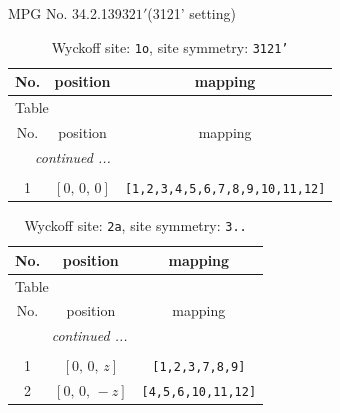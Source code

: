 \documentclass[fleqn,8pt]{jsarticle}
\begin{document}
\setcounter{MaxMatrixCols}{32}

\renewcommand{\tablename}{Table~}
\renewcommand{\figurename}{Figure~}
\begin{center}
\LARGE
MPG No. 34.2.139\quad$321'$\quad(3121' setting)
\end{center}
\renewcommand{\arraystretch}{1.2}
\begin{longtable}{ccc}
\caption{Wyckoff site: {\tt 1o}, site symmetry: {\tt 3121'}}
 \\
 \hline \hline
No. & position & mapping \\ \hline \endfirsthead

\multicolumn{2}{l}{\tablename\ \thetable{}} \\
 \hline \hline
No. & position & mapping \\ \hline \endhead

 \hline \hline
\multicolumn{2}{r}{\footnotesize\it continued ...} \\ \endfoot

 \hline \hline
\multicolumn{2}{r}{} \\ \endlastfoot

1 & $\left[ 0,\, 0,\, 0 \right]$ & {\tt [1,2,3,4,5,6,7,8,9,10,11,12]} \\
\end{longtable}
\renewcommand{\arraystretch}{1.2}
\begin{longtable}{ccc}
\caption{Wyckoff site: {\tt 2a}, site symmetry: {\tt 3..}}
 \\
 \hline \hline
No. & position & mapping \\ \hline \endfirsthead

\multicolumn{2}{l}{\tablename\ \thetable{}} \\
 \hline \hline
No. & position & mapping \\ \hline \endhead

 \hline \hline
\multicolumn{2}{r}{\footnotesize\it continued ...} \\ \endfoot

 \hline \hline
\multicolumn{2}{r}{} \\ \endlastfoot

1 & $\left[ 0,\, 0,\, z \right]$ & {\tt [1,2,3,7,8,9]} \\ \hline
2 & $\left[ 0,\, 0,\, - z \right]$ & {\tt [4,5,6,10,11,12]} \\
\end{longtable}
\renewcommand{\arraystretch}{1.2}
\end{document}
